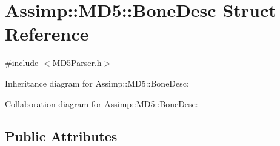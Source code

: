 \hypertarget{struct_assimp_1_1_m_d5_1_1_bone_desc}{\section{Assimp\+:\+:M\+D5\+:\+:Bone\+Desc Struct Reference}
\label{struct_assimp_1_1_m_d5_1_1_bone_desc}
}


{\ttfamily \#include $<$M\+D5\+Parser.\+h$>$}



Inheritance diagram for Assimp\+:\+:M\+D5\+:\+:Bone\+Desc\+:


Collaboration diagram for Assimp\+:\+:M\+D5\+:\+:Bone\+Desc\+:
\subsection*{Public Attributes}
